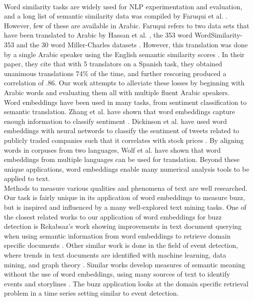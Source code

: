 \\
Word similarity tasks are widely used for NLP experimentation and evaluation, and a long list of semantic similarity data was compiled by Faruqui et al. \cite{faruqui:2014}. However, few of these are available in Arabic. Faruqui refers to two data sets that have been translated to Arabic by Hassan et al. \cite{hassan:2009}, the 353 word WordSimilarity-353 and the 30 word Miller-Charles datasets \cite{finkelstein:2001,miller:1991}. However, this translation was done by a single Arabic speaker using the English semantic similarity scores \cite{hassan:2009}. In their paper, they cite that with 5 translators on a Spanish task, they obtained unanimous translations 74\% of the time, and further rescoring produced a correlation of .86. Our work attempts to alleviate these losses by beginning with Arabic words and evaluating them all with multiple fluent Arabic speakers.
\\
Word embeddings have been used in many tasks, from sentiment classification to semantic translation. Zhang et al. have shown that word embeddings capture enough information to classify sentiment \cite{zhang2015chinese}. Dickinson et al. have used word embeddings with neural networds to classify the sentiment of tweets related to publicly traded companies such that it correlates with stock prices \cite{dickinson2015sentiment}. By aligning words in corpuses from two languages, Wolf et al. have shown that word embeddings from multiple languages can be used for translation. Beyond these unique applications, word embeddings enable many numerical analysis tools to be applied to text.
\\
Methods to measure various qualities and phenomena of text are well researched. Our task is fairly unique in its application of word embeddings to measure buzz, but is inspired and influenced by a many well-explored text mining tasks. One of the closest related works to our application of word embeddings for buzz detection is Rekabsaz's work showing improvements in text document querying when using semantic information from word embeddings to retrieve domain specific documents \cite{rekabsazusing}. Other similar work is done in the field of event detection, where trends in text documents are identified with machine learning, data mining, and graph theory \cite{radinsky2012learning}. Similar works develop measures of semantic meaning without the use of word embeddings, using many sources of text to identify events and storylines \cite{Wei:2016}. The buzz application looks at the domain specific retrieval problem in a time series setting similar to event detection.
